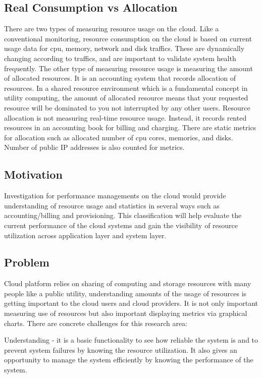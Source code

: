 \documentclass{sig-alternate}
\begin{document}
\subsection{Real Consumption vs Allocation}
There are two types of measuring resource usage on the cloud. Like a conventional monitoring, resource consumption on the cloud is based on current usage data for cpu, memory, network and disk traffics. These are dynamically changing according to traffics, and are important to validate system health frequently. The other type of measuring resource usage is measuring the amount of allocated resources. It is an accounting system that records allocation of resources. In a shared resource environment which is a fundamental concept in utility computing, the amount of allocated resource means that your requested resource will be dominated to you not interrupted by any other users. Resource allocation is not measuring real-time resource usage. Instead, it records rented resources in an accounting book for billing and charging. There are static metrics for allocation such as allocated number of cpu cores, memories, and disks. Number of public IP addresses is also counted for metrics.

\subsection{Motivation}

Investigation for performance managements on the cloud would provide understanding of resource usage and statistics in several ways such as accounting/billing and provisioning. This classification will help evaluate the current performance of the cloud systems and gain the visibility of resource utilization across application layer and system layer. 

\subsection{Problem}

Cloud platform relies on sharing of computing and storage resources with many people like a public utility, understanding amounts of the usage of resources is getting important to the cloud users and cloud providers. It is not only important measuring use of resources but also important displaying metrics via graphical charts. There are concrete challenges for this research area: 

Understanding - it is a basic functionality to see how reliable the system is and to prevent system failures by knowing the resource utilization. It also gives an opportunity to manage the system efficiently by knowing the performance of the system. 
\end{document}
